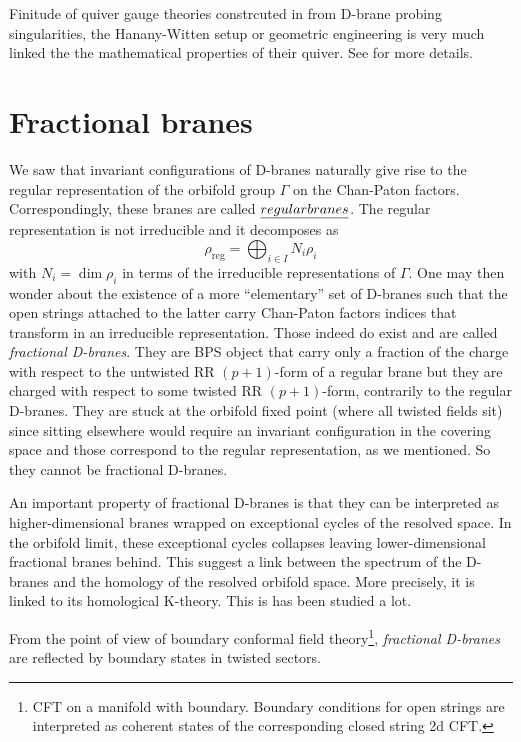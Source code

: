     Finitude of quiver gauge theories constrcuted in from D-brane probing singularities, the Hanany-Witten setup or geometric engineering is very much linked the the mathematical properties of their quiver. See \cite{Hanany:1999sp} for more details.

\section{Fractional branes}
    
    We saw that invariant configurations of D-branes naturally give rise to the regular representation of the orbifold group $\Gamma$ on the Chan-Paton factors. Correspondingly, these branes are called $\emph{regular branes}$. The regular representation is not irreducible and it decomposes as
    \begin{equation}
        \rho_{\text{reg}}=\bigoplus_{i\in I} N_i\rho_i
    \end{equation}
    with $N_i=\dim\rho_i$ in terms of the irreducible representations of $\Gamma$. One may then wonder about the existence of a more ``elementary'' set of D-branes such that the open strings attached to the latter carry Chan-Paton factors indices that transform in an irreducible representation. Those indeed do exist and are called \emph{fractional D-branes}. They are BPS object that carry only a fraction of the charge with respect to the untwisted RR $(p+1)$-form of a regular brane but they are charged with respect to some twisted RR $(p+1)$-form, contrarily to the regular D-branes. They are stuck at the orbifold fixed point (where all twisted fields sit) since sitting elsewhere would require an invariant configuration in the covering space and those correspond to the regular representation, as we mentioned. So they cannot be fractional D-branes.

    An important property of fractional D-branes is that they can be interpreted as higher-dimensional branes wrapped on exceptional cycles of the resolved space. In the orbifold limit, these exceptional cycles collapses leaving lower-dimensional fractional branes behind. This suggest a link between the spectrum of the D-branes and the homology of the resolved orbifold space. More precisely, it is linked to its homological K-theory. This is has been studied a lot.

    From the point of view of boundary conformal field theory\footnote{CFT on a manifold with boundary. Boundary conditions for open strings are interpreted as coherent states of the corresponding closed string 2d CFT.}, \emph{fractional D-branes} are reflected by boundary states in twisted sectors.

